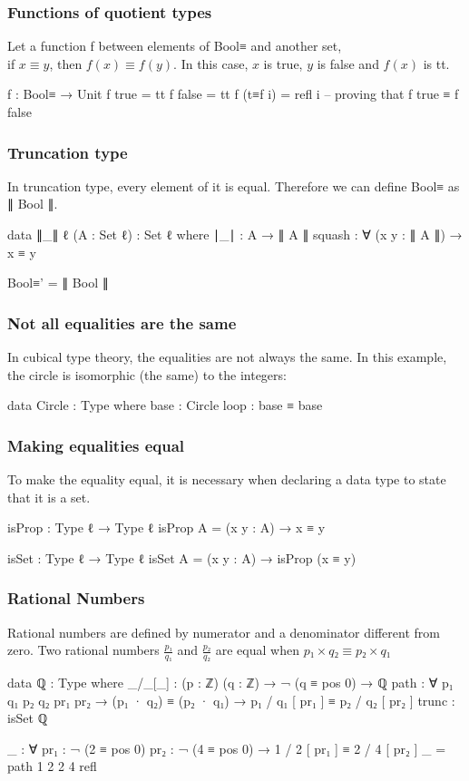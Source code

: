 \documentclass{beamer}
\begin{document}
\begin{frame}
  \frametitle{Functions of quotient types}
  Let a function f between elements of Bool≡ and another set, \\
  if $ x \equiv y $, then $ f(x) \equiv f(y) $.
  In this case, $ x $ is true, $ y $ is false and $ f(x) $ is tt.
  \begin{code}
  f : Bool≡ → Unit
  f true    = tt
  f false   = tt
  f (t≡f i) = refl i -- proving that f true ≡ f false

  \end{code}

\end{frame}

\begin{frame}
  \frametitle{Truncation type}

  In truncation type, every element of it is equal.
  Therefore we can define Bool≡ as ∥ Bool ∥.

  \begin{code}
  data ∥_∥ {ℓ} (A : Set ℓ) : Set ℓ where
    ∣_∣ : A → ∥ A ∥
    squash : ∀ (x y : ∥ A ∥) → x ≡ y

  Bool≡' = ∥ Bool ∥
  \end{code}
\end{frame}

\begin{frame}
  \frametitle{Not all equalities are the same}
  In cubical type theory, the equalities are not always the same.
  In this example, the circle is isomorphic (the same) to the integers:
  \begin{code}
  data Circle : Type where
    base : Circle
    loop : base ≡ base
  \end{code}
\end{frame}

\begin{frame}
  \frametitle{Making equalities equal}
  To make the equality equal, it is necessary when declaring a data type to state that it is a set.
  \begin{code}
  isProp : Type ℓ → Type ℓ
  isProp A = (x y : A) → x ≡ y

  isSet : Type ℓ → Type ℓ
  isSet A = (x y : A) → isProp (x ≡ y)
  \end{code}
\end{frame}

\begin{frame}
  \frametitle{Rational Numbers}
  Rational numbers are defined by numerator and a denominator different from zero.
  Two rational numbers $ \frac{p₁}{q₁} $ and $ \frac{p₂}{q₂} $ are equal when $ p₁ \times q₂ \equiv p₂ \times q₁ $
  \begin{code}
  data ℚ : Type where
    _/_[_] : (p : ℤ) (q : ℤ) → ¬ (q ≡ pos 0) → ℚ
    path : ∀ p₁ q₁ p₂ q₂ {pr₁ pr₂} → (p₁ · q₂) ≡ (p₂ · q₁)
      → p₁ / q₁ [ pr₁ ] ≡ p₂ / q₂ [ pr₂ ]
    trunc : isSet ℚ

  _ : ∀ {pr₁ : ¬ (2 ≡ pos 0)} {pr₂ : ¬ (4 ≡ pos 0)}
    → 1 / 2 [ pr₁ ] ≡ 2 / 4 [ pr₂ ]
  _ = path 1 2 2 4 refl
  \end{code}
\end{frame}
\end{document}
